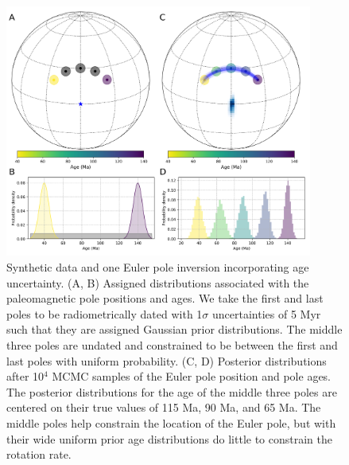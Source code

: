 \documentclass[11pt,letterpaper]{article}
\begin{document}
\begin{figure}
\centering
\includegraphics[width=0.9\textwidth]{fig_inversion_with_age_uncertainties.png}
\caption{Synthetic data and one Euler pole inversion incorporating age uncertainty. (A, B) Assigned distributions associated with the paleomagnetic pole positions and ages. We take the first and last poles to be radiometrically dated with 1$\sigma$ uncertainties of 5 Myr such that they are assigned Gaussian prior distributions. The middle three poles are undated and constrained to be between the first and last poles with uniform probability. (C, D) Posterior distributions after 10$^4$ MCMC samples of the Euler pole position and pole ages. The posterior distributions for the age of the middle three poles are centered on their true values of 115 Ma, 90 Ma, and 65 Ma. The middle poles help constrain the location of the Euler pole, but with their wide uniform prior age distributions do little to constrain the rotation rate.}
\label{fig:age_uncertainty_samples}
\end{figure}
\end{document}

